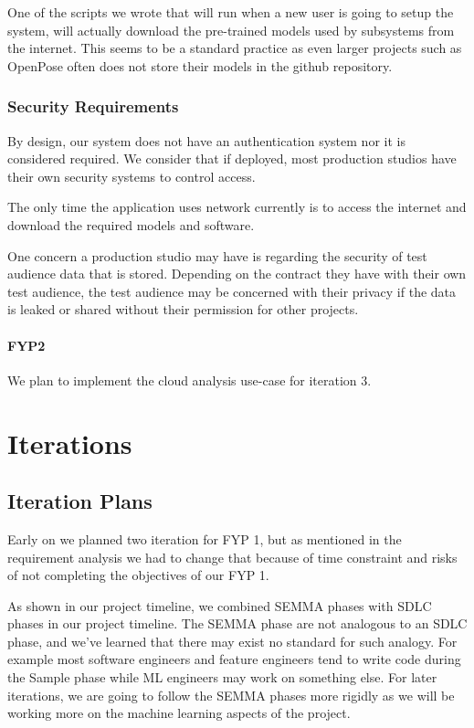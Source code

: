 \documentclass[12pt,a4paper,man]{report}
\begin{document}
One of the scripts we wrote that will run when a new user is going to setup the system, will actually download the pre-trained models used by subsystems from the internet. This seems to be a standard practice as even larger projects such as OpenPose often does not store their models in the github repository. 

\section{Security Requirements}
\label{sec:org1d5e1d7}
By design, our system does not have an authentication system nor it is considered required. We consider that if deployed, most production studios have their own security systems to control access.

The only time the application uses network currently is to access the internet and download the required models and software.

One concern a production studio may have is regarding the security of test audience data that is stored. Depending on the contract they have with their own test audience, the test audience may be concerned with their privacy if the data is leaked or shared without their permission for other projects.


\subsection{FYP2}
\label{sec:org661174e}
We plan to implement the cloud analysis use-case for iteration 3.

\part{Iterations}
\label{sec:org73cf7a3}
\chapter{Iteration Plans}
\label{sec:org283800b}
Early on we planned two iteration for FYP 1, but as mentioned in the requirement analysis we had to change that because of time constraint and risks of not completing the objectives of our FYP 1. 

As shown in our project timeline, we combined SEMMA phases with SDLC phases in our project timeline. The SEMMA phase are not analogous to an SDLC phase, and we've learned that there may exist no standard for such analogy. For example most software engineers and feature engineers tend to write code during the Sample phase while ML engineers may work on something else. For later iterations, we are going to follow the SEMMA phases more rigidly as we will be working more on the machine learning aspects of the project.
\end{document}
